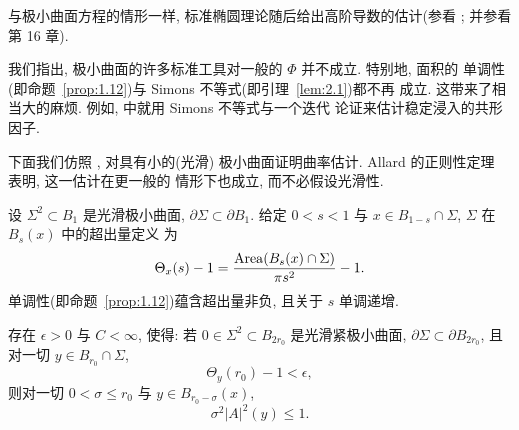 与极小曲面方程的情形一样, 标准椭圆理论随后给出高阶导数的估计(参看
\cite{Si2}; 并参看 \cite{GiTr} 第 16 章).

我们指出, 极小曲面的许多标准工具对一般的 $\Phi$ 并不成立. 特别地, 面积的
单调性(即命题~\ref{prop:1.12})与 Simons 不等式(即引理~\ref{lem:2.1})都不再
成立. 这带来了相当大的麻烦. 例如, \cite{Sc1} 中就用 Simons 不等式与一个迭代
论证来估计稳定浸入的共形因子.

下面我们仿照 \cite{CM2}, 对具有小的(光滑)
极小曲面证明曲率估计. Allard 的正则性定理 \cite{Al1} 表明, 这一估计在更一般的
情形下也成立, 而不必假设光滑性.

设 $\Sigma^2\subset B_1$ 是光滑极小曲面, $\partial\Sigma\subset\partial B_1$.
给定 $0<s<1$ 与 $x\in B_{1-s}\cap\Sigma$, $\Sigma$ 在 $B_s(x)$ 中的超出量定义
为
\begin{equation}
\Theta_x(s)-1=\frac{\operatorname{Area}(B_s(x)\cap\Sigma)}{\pi s^{2}}-1.
\label{eq:2.71}
\end{equation}
单调性(即命题~\ref{prop:1.12})蕴含超出量非负, 且关于 $s$ 单调递增.

\begin{theorem}
\label{thm:2.15}
存在 $\epsilon>0$ 与 $C<\infty$, 使得: 若
$0\in\Sigma^2\subset B_{2r_0}$ 是光滑紧极小曲面,
$\partial\Sigma\subset\partial B_{2r_0}$, 且对一切 $y\in B_{r_0}\cap\Sigma$,
\begin{equation}
\Theta_y(r_0)-1<\epsilon,
\label{eq:2.72}
\end{equation}
则对一切 $0<\sigma\leq r_0$ 与 $y\in B_{r_0-\sigma}(x)$,
\begin{equation}
\sigma^{2}|A|^{2}(y)\leq1.
\label{eq:2.73}
\end{equation}
\end{theorem}

